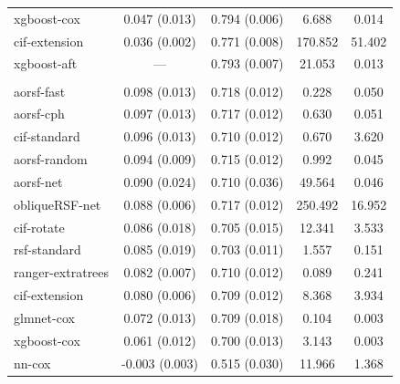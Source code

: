 \documentclass[twoside,11pt]{article}\usepackage[]{graphicx}\usepackage[]{xcolor}
\newenvironment{knitrout}{}{} %
\begin{document}
\begin{knitrout}
\begin{longtable}[t]{lcccc}
\hspace{1em}xgboost-cox & 0.047 (0.013) & 0.794 (0.006) & 6.688 & 0.014\\
\hspace{1em}cif-extension & 0.036 (0.002) & 0.771 (0.008) & 170.852 & 51.402\\
\hspace{1em}xgboost-aft & --- & 0.793 (0.007) & 21.053 & 0.013\\
\addlinespace[0.3em]
\multicolumn{5}{l}{\textit{\textbf{Colon cancer; death, n = 929, p = 12}}}\\
\hline
\hspace{1em}aorsf-fast & 0.098 (0.013) & 0.718 (0.012) & 0.228 & 0.050\\
\hspace{1em}aorsf-cph & 0.097 (0.013) & 0.717 (0.012) & 0.630 & 0.051\\
\hspace{1em}cif-standard & 0.096 (0.013) & 0.710 (0.012) & 0.670 & 3.620\\
\hspace{1em}aorsf-random & 0.094 (0.009) & 0.715 (0.012) & 0.992 & 0.045\\
\hspace{1em}aorsf-net & 0.090 (0.024) & 0.710 (0.036) & 49.564 & 0.046\\
\hspace{1em}obliqueRSF-net & 0.088 (0.006) & 0.717 (0.012) & 250.492 & 16.952\\
\hspace{1em}cif-rotate & 0.086 (0.018) & 0.705 (0.015) & 12.341 & 3.533\\
\hspace{1em}rsf-standard & 0.085 (0.019) & 0.703 (0.011) & 1.557 & 0.151\\
\hspace{1em}ranger-extratrees & 0.082 (0.007) & 0.710 (0.012) & 0.089 & 0.241\\
\hspace{1em}cif-extension & 0.080 (0.006) & 0.709 (0.012) & 8.368 & 3.934\\
\hspace{1em}glmnet-cox & 0.072 (0.013) & 0.709 (0.018) & 0.104 & 0.003\\
\hspace{1em}xgboost-cox & 0.061 (0.012) & 0.700 (0.013) & 3.143 & 0.003\\
\hspace{1em}nn-cox & -0.003 (0.003) & 0.515 (0.030) & 11.966 & 1.368\\

\end{longtable}
\end{knitrout}
\end{document}
